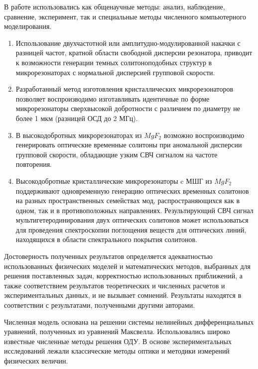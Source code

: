 {\methods} В работе использовались как общенаучные методы: анализ, наблюдение, сравнение, эксперимент, так и специальные методы численного компьютерного моделирования.

{}
\begin{enumerate}
  \item Использование двухчастотной или амплитудно-модулированной накачки с разницей частот, кратной области свободной дисперсии резонатора, приводит к возможности генерации темных солитоноподобных структур в микрорезонаторах с нормальной дисперсией групповой скорости.
  \item Разработанный метод изготовления кристаллических микрорезонаторов позволяет воспроизводимо изготавливать идентичные по форме микрорезонаторы сверхвысокой добротности с различием по диаметру не более 1 мкм (разницей ОСД до 2 МГц).
  \item В высокодобротных микрорезонаторах из $MgF_2$ возможно воспроизводимо генерировать оптические временные солитоны при аномальной дисперсии групповой скорости, обладающие узким СВЧ сигналом на частоте повторения.
  \item Высокодобротные кристаллические микрорезонаторы c МШГ из $MgF_2$ поддерживают одновременную генерацию оптических временных солитонов на разных пространственных семействах мод, распространяющихся как в одном, так и в противоположных направлениях. Результирующий СВЧ сигнал мультигетеродинирования двух оптических солитонов может использоваться для проведения спектроскопии поглощения веществ для оптических линий, находящихся в области спектрального покрытия солитонов.
\end{enumerate}

{\reliability} Достоверность полученных результатов определяется адекватностью использованных физических моделей и математических методов, выбранных для решения поставленных задач, корректностью использованных приближений, а также
соответствием результатов теоретических и численных расчетов и экспериментальных данных, и не вызывает сомнений. Результаты находятся в соответствии с результатами, полученными другими авторами.

Численная модель основана на решении системы нелинейных дифференциальных уравнений, полученных из уравнений Максвелла. Использовались широко известные численные методы решения ОДУ. В основе экспериментальных исследований лежали классические методы оптики и методики измерений физических величин.

